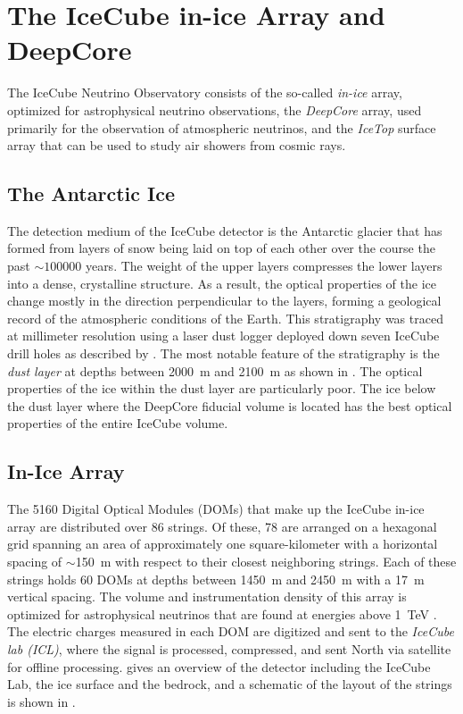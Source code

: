\section{The IceCube in-ice Array and DeepCore}

The IceCube Neutrino Observatory consists of the so-called \emph{in-ice} array, optimized for astrophysical neutrino observations, the \emph{DeepCore} array, used primarily for the observation of atmospheric neutrinos, and the \emph{IceTop} surface array that can be used to study air showers from cosmic rays.

\subsection{The Antarctic Ice}

The detection medium of the IceCube detector is the Antarctic glacier that has formed from layers of snow being laid on top of each other over the course the past $\sim\num{100000}$ years. The weight of the upper layers compresses the lower layers into a dense, crystalline structure. As a result, the optical properties of the ice change mostly in the direction perpendicular to the layers, forming a geological record of the atmospheric conditions of the Earth. This stratigraphy was traced at millimeter resolution using a laser dust logger deployed down seven IceCube drill holes as described by \cite{dustlogger}. The most notable feature of the stratigraphy is the \emph{dust layer} at depths between 2000~m and 2100~m as shown in . The optical properties of the ice within the dust layer are particularly poor. The ice below the dust layer where the DeepCore fiducial volume is located has the best optical properties of the entire IceCube volume.

\subsection{In-Ice Array}
The 5160 Digital Optical Modules (DOMs) that make up the IceCube in-ice array are distributed over 86 strings. Of these, 78 are arranged on a hexagonal grid spanning an area of approximately one square-kilometer with a horizontal spacing of $\sim$150~m with respect to their closest neighboring strings. Each of these strings holds 60 DOMs at depths between 1450~m and 2450~m with a 17~m vertical spacing. The volume and instrumentation density of this array is optimized for astrophysical neutrinos that are found at energies above 1~TeV \cite{icecube_detector_17}.
The electric charges measured in each DOM are digitized  and sent to the \emph{IceCube lab (ICL)}, where the signal is processed, compressed, and sent North via satellite for offline processing.  gives an overview of the detector including the IceCube Lab, the ice surface and the bedrock, and a schematic of the layout of the strings is shown in .

